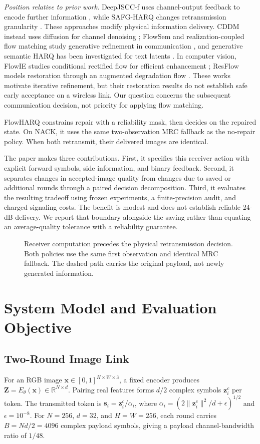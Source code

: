 \documentclass[conference]{IEEEtran}
\begin{document}
\textit{Position relative to prior work.}
DeepJSCC-f uses channel-output feedback to encode further information
\cite{deepjscc_f}, while SAFG-HARQ changes retransmission granularity
\cite{fineharq}. These approaches modify physical information delivery.
CDDM instead uses diffusion for channel denoising \cite{cddm}; FlowSem and
realization-coupled flow matching study generative refinement in communication
\cite{flowsem,rcbfm}, and generative semantic HARQ has been investigated for
text latents \cite{genharq}. In computer vision, FlowIE studies conditional
rectified flow for efficient enhancement \cite{Zhu_2024_CVPR}; ResFlow models
restoration through an augmented degradation flow \cite{Qin_2025_CVPR}.
These works motivate iterative refinement, but their restoration results do
not establish safe early acceptance on a wireless link. Our question concerns
the subsequent communication decision, not priority for applying flow matching.

FlowHARQ constrains repair with a reliability mask, then decides on the repaired
state. On NACK, it uses the same two-observation MRC fallback as the no-repair
policy. When both retransmit, their delivered images are identical.

The paper makes three contributions. First, it specifies this receiver action
with explicit forward symbols, side information, and binary feedback. Second,
it separates changes in accepted-image quality from changes due to saved or
additional rounds through a paired decision decomposition. Third, it evaluates
the resulting tradeoff using frozen experiments, a finite-precision audit,
and charged signaling costs. The benefit is modest and does not establish
reliable 24-dB delivery. We report that boundary alongside the saving rather
than equating an average-quality tolerance with a reliability guarantee.

\begin{figure}[t]
\centering
\resizebox{.93\columnwidth}{!}{}
\caption{Receiver computation precedes the physical retransmission decision.
Both policies use the same first observation and identical MRC fallback. The
dashed path carries the original payload, not newly generated information.}
\label{fig:system}
\end{figure}

\section{System Model and Evaluation Objective}
\subsection{Two-Round Image Link}
For an RGB image $\mathbf x\in[0,1]^{H\times W\times3}$, a fixed encoder
produces $\mathbf Z=E_\theta(\mathbf x)\in\mathbb R^{N\times d}$.
Pairing real features forms $d/2$ complex symbols $\mathbf z_i^c$ per token.
The transmitted token is $\mathbf s_i=\mathbf z_i^c/\alpha_i$, where
$\alpha_i=(2\|\mathbf z_i^c\|^2/d+\epsilon)^{1/2}$ and $\epsilon=10^{-8}$.
For $N=256$, $d=32$, and $H=W=256$, each round carries $B=Nd/2=4096$
complex payload symbols, giving a payload channel-bandwidth ratio of $1/48$.
\end{document}
